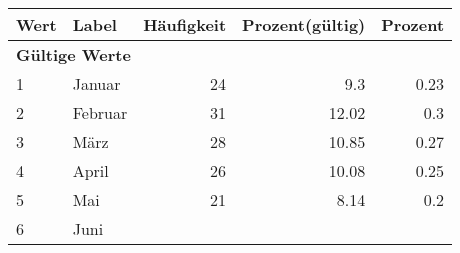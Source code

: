      \begin{longtable}{lXrrr}
     \toprule
     \textbf{Wert} & \textbf{Label} & \textbf{Häufigkeit} & \textbf{Prozent(gültig)} & \textbf{Prozent} \\
     \endhead
     \midrule
     \multicolumn{5}{l}{\textbf{Gültige Werte}}\\

     1 &
     \multicolumn{1}{X}{ Januar   } &


       \num{24} &
       \num[round-mode=places,round-precision=2]{9,3} &
         \num[round-mode=places,round-precision=2]{0,23} \\

     2 &
     \multicolumn{1}{X}{ Februar   } &


       \num{31} &
       \num[round-mode=places,round-precision=2]{12,02} &
         \num[round-mode=places,round-precision=2]{0,3} \\

     3 &
     \multicolumn{1}{X}{ März   } &


       \num{28} &
       \num[round-mode=places,round-precision=2]{10,85} &
         \num[round-mode=places,round-precision=2]{0,27} \\

     4 &
     \multicolumn{1}{X}{ April   } &


       \num{26} &
       \num[round-mode=places,round-precision=2]{10,08} &
         \num[round-mode=places,round-precision=2]{0,25} \\

     5 &
     \multicolumn{1}{X}{ Mai   } &


       \num{21} &
       \num[round-mode=places,round-precision=2]{8,14} &
         \num[round-mode=places,round-precision=2]{0,2} \\

     6 &
     \multicolumn{1}{X}{ Juni   } &



\end{longtable}
